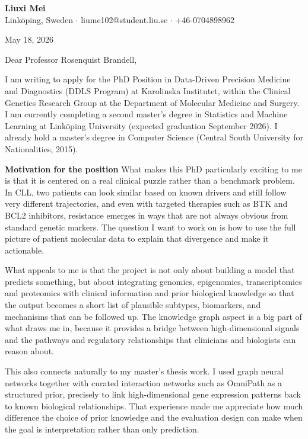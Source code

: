 \documentclass[11pt,a4paper]{article}
\begin{document}
\begin{center}
    {\LARGE \textbf{Liuxi Mei}} \\
    \vspace{2mm}
    Linköping, Sweden $\cdot$ liume102@student.liu.se $\cdot$ +46-0704898962
    \vspace{4mm}
\end{center}

\begin{flushright}
May 18, 2026
\end{flushright}
 
Dear Professor Rosenquist Brandell,

I am writing to apply for the PhD Position in Data-Driven Precision Medicine and Diagnostics (DDLS Program) at Karolinska Institutet, within the Clinical Genetics Research Group at the Department of Molecular Medicine and Surgery. I am currently completing a second master's degree in Statistics and Machine Learning at Linköping University (expected graduation September 2026). I already hold a master's degree in Computer Science (Central South University for Nationalities, 2015).

\textbf{Motivation for the position} What makes this PhD particularly exciting to me is that it is centered on a real clinical puzzle rather than a benchmark problem. In CLL, two patients can look similar based on known drivers and still follow very different trajectories, and even with targeted therapies such as BTK and BCL2 inhibitors, resistance emerges in ways that are not always obvious from standard genetic markers. The question I want to work on is how to use the full picture of patient molecular data to explain that divergence and make it actionable.

What appeals to me is that the project is not only about building a model that predicts something, but about integrating genomics, epigenomics, transcriptomics and proteomics with clinical information and prior biological knowledge so that the output becomes a short list of plausible subtypes, biomarkers, and mechanisms that can be followed up. The knowledge graph aspect is a big part of what draws me in, because it provides a bridge between high-dimensional signals and the pathways and regulatory relationships that clinicians and biologists can reason about.

This also connects naturally to my master’s thesis work. I used graph neural networks together with curated interaction networks such as OmniPath as a structured prior, precisely to link high-dimensional gene expression patterns back to known biological relationships. That experience made me appreciate how much difference the choice of prior knowledge and the evaluation design can make when the goal is interpretation rather than only prediction.
\end{document}
